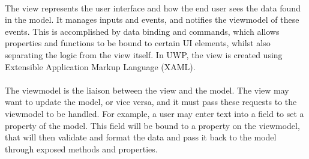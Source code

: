 	\paragraph{}{
	The view represents the user interface and how the end user sees the data found in the model. It manages inputs and events, and notifies the viewmodel of these events. This is accomplished by data binding and commands, which allows properties and functions to be bound to certain UI elements, whilst also separating the logic from the view itself. In UWP, the view is created using Extensible Application Markup Language (XAML).
	}
	\paragraph{}{
	The viewmodel is the liaison between the view and the model. The view may want to update the model, or vice versa, and it must pass these requests to the viewmodel to be handled. For example, a  user may enter text into a field to set a property of the model. This field will be bound to a property on the viewmodel, that will then validate and format the data and pass it back to the model through exposed methods and properties.
	}	